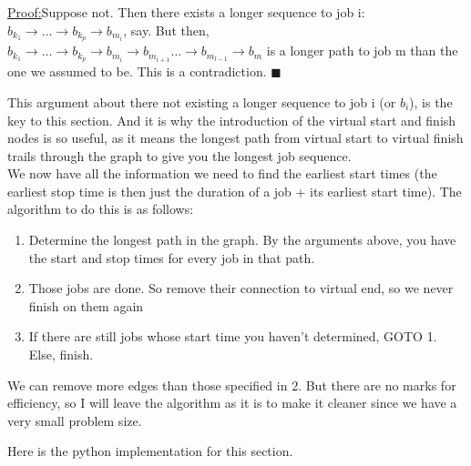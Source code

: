 \documentclass[paper=a4, fontsize=12pt]{scrartcl} %
\newenvironment{claimproof}[1]{\par\noindent\underline{Proof:}\space#1}{\hfill $\blacksquare$}
\numberwithin{equation}{section}       %
\numberwithin{figure}{section}         %
\numberwithin{table}{section}          %
\begin{document}
\begin{claimproof}
Suppose not. Then there exists a longer sequence to job i: $b_{k_{1}} \to \dots \to b_{k_{p}} \to b_{m_{i}}$, say. But then, $b_{k_{1}} \to \dots \to b_{k_{p}} \to b_{m_{i}} \to b_{m_{i+1}} \dots \to b_{m_{l-1}} \to b_{m}$ is a longer path to job m than the one we assumed to be. This is a contradiction.
\end{claimproof}

This argument about there not existing a longer sequence to job i (or $b_{i}$), is the key to this section. And it is why the introduction of the virtual start and finish nodes is so useful, as it means the longest path from virtual start to virtual finish trails through the graph to give you the longest job sequence. \\ 

We now have all the information we need to find the earliest start times (the earliest stop time is then just the duration of a job + its earliest start time). The algorithm to do this is as follows:

\begin{enumerate}
\item Determine the longest path in the graph. By the arguments above, you have the start and stop times for every job in that path.
\item Those jobs are done. So remove their connection to virtual end, so we never finish on them again
\item If there are still jobs whose start time you haven't determined, GOTO 1. Else, finish.
\end{enumerate}

\bcattention \quad We can remove more edges than those specified in 2. But there are no marks for efficiency, so I will leave the algorithm as it is to make it cleaner since we have a very small problem size.

Here is the python implementation for this section.
\end{document}
